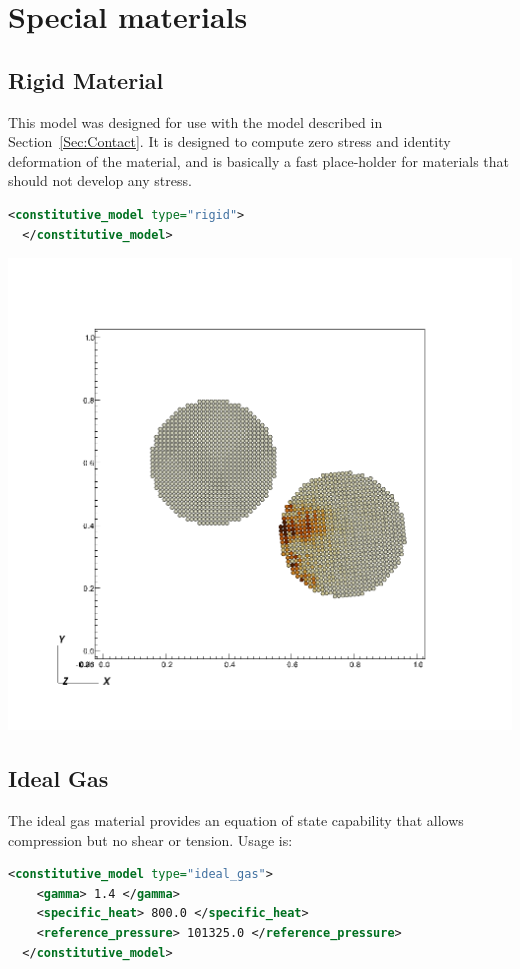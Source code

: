 \section{Special materials}
\subsection{Rigid Material}  This model was designed for use with the
 model described in Section~\ref{Sec:Contact}.
It is designed to compute zero stress and identity deformation of the material,
and is basically a fast place-holder for materials that should not develop
any stress.

\begin{lstlisting}[language=XML]
  <constitutive_model type="rigid">
  </constitutive_model>
\end{lstlisting}

\begin{minipage}[t]{0.9\textwidth}
  \centering
  \includegraphics[width=0.5\columnwidth]{FIGS/contact/specified2.png}
\end{minipage}

\subsection{Ideal Gas}  
The ideal gas material provides an equation of state capability that allows
compression but no shear or tension.  Usage is:
\begin{lstlisting}[language=XML]
  <constitutive_model type="ideal_gas">
    <gamma> 1.4 </gamma>
    <specific_heat> 800.0 </specific_heat>
    <reference_pressure> 101325.0 </reference_pressure>
  </constitutive_model>
\end{lstlisting}


